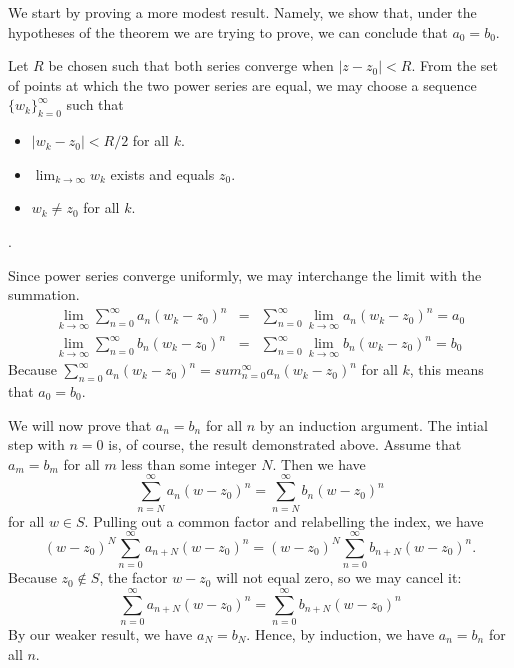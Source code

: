 \documentclass[12pt]{article}
\begin{document}
We start by proving a more modest result.  Namely, we show that,
under the hypotheses of the theorem we are trying to prove, we
can conclude that $a_0 = b_0$. 

Let $R$ be chosen such that both series converge when $|z - z_0| < R$.
From the set of points at which the two power series are equal, we may
choose a sequence $\{ w_k \}_{k=0}^\infty$ such that
\begin{itemize}
\item $|w_k - z_0| < R/2$ for all $k$.
\item $\lim_{k \to \infty} w_k$ exists and equals $z_0$.
\item $w_k \neq z_0$ for all $k$.
\end{itemize}.

Since power series converge uniformly, we may interchange the
limit with the summation.
\begin{eqnarray*}
\lim_{k \to \infty} \sum_{n=0}^\infty
a_n (w_k - z_0)^n &=& 
\sum_{n=0}^\infty \lim_{k \to \infty}
a_n (w_k - z_0)^n = a_0 \\
\lim_{k \to \infty} \sum_{n=0}^\infty
b_n (w_k - z_0)^n &=& 
\sum_{n=0}^\infty \lim_{k \to \infty}
b_n (w_k - z_0)^n = b_0
\end{eqnarray*}
Because $\sum_{n=0}^\infty a_n (w_k - z_0)^n =
sum_{n=0}^\infty a_n (w_k - z_0)^n$ for all $k$,
this means that $a_0 = b_0$.

We will now prove that $a_n = b_n$ for all $n$ by
an induction argument.  The intial step with $n = 0$
is, of course, the result demonstrated above. 
Assume that $a_m = b_m$ for all $m$ less than 
some integer $N$.  Then we have
\[
\sum_{n=N}^\infty a_n (w - z_0)^n =
\sum_{n=N}^\infty b_n (w - z_0)^n
\]
for all $w \in S$.  Pulling out a common
factor and relabelling the index, we have
\[
(w - z_0)^N \sum_{n=0}^\infty a_{n+N} (w - z_0)^n =
(w - z_0)^N \sum_{n=0}^\infty b_{n+N} (w - z_0)^n.
\]
Because $z_0 \notin S$, the factor $w - z_0$ will
not equal zero, so we may cancel it:
\[
\sum_{n=0}^\infty a_{n+N} (w - z_0)^n =
\sum_{n=0}^\infty b_{n+N} (w - z_0)^n
\]
By our weaker result, we have $a_N = b_N$.
Hence, by induction, we have $a_n = b_n$ for all $n$.
\end{document}
